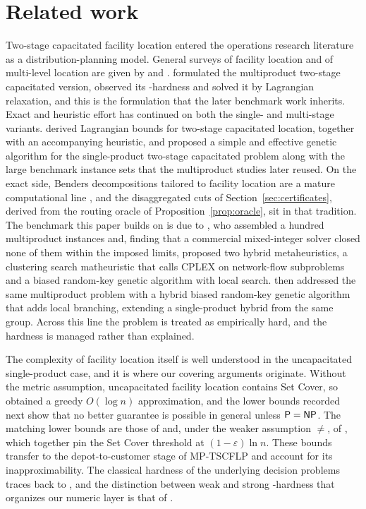 \section{Related work}\label{sec:literature}

Two-stage capacitated facility location entered the operations research
literature as a distribution-planning model. General surveys of facility
location and of multi-level location are given by \citet{KloseDrexl2005}
and \citet{OrtizAstorquizaEtAl2018}.
\citet{PirkulJayaraman1998} formulated the multiproduct two-stage
capacitated version, observed its \NP-hardness and solved it by
Lagrangian relaxation, and this is the formulation that the later
benchmark work inherits. Exact and heuristic effort has continued on both
the single- and multi-stage variants. \citet{LitvinchevOzuna2012} derived
Lagrangian bounds for two-stage capacitated location, together with an
accompanying heuristic, and \citet{FernandesEtAl2014} proposed a simple
and effective genetic algorithm for the single-product two-stage capacitated problem
along with the large benchmark instance sets that the multiproduct
studies later reused. On the exact side, Benders decompositions tailored
to facility location are a mature computational line
\citep{FischettiLjubicSinnl2017}, and the disaggregated cuts of
Section~\ref{sec:certificates}, derived from the routing oracle of
Proposition~\ref{prop:oracle}, sit in that tradition. The benchmark this paper builds on is due
to \citet{MauriEtAl2021}, who assembled a hundred multiproduct instances
and, finding that a commercial mixed-integer solver closed none of them
within the imposed limits, proposed two hybrid metaheuristics, a
clustering search matheuristic that calls CPLEX on network-flow
subproblems and a biased random-key genetic algorithm with local search.
\citet{MoraisEtAl2022} then addressed the same multiproduct problem with
a hybrid biased random-key genetic algorithm that adds local branching,
extending a single-product hybrid from the same group. Across this line the problem is treated as empirically hard, and
the hardness is managed rather than explained.

The complexity of facility location itself is well understood in the
uncapacitated single-product case, and it is where our covering arguments
originate. Without the metric assumption, uncapacitated facility location
contains Set Cover, so \citet{Hochbaum1982} obtained a greedy
$O(\log n)$ approximation, and the lower bounds recorded next show that no
better guarantee is possible in general unless $\textsf{P}=\textsf{NP}$.
The matching lower bounds are those of \citet{Feige1998} and, under the
weaker assumption \Ppoly${}\neq{}$\NP, of \citet{DinurSteurer2014},
which together pin the Set Cover threshold at $(1-\varepsilon)\ln n$.
These bounds transfer to the depot-to-customer stage of MP-TSCFLP and
account for its inapproximability. The classical hardness of the
underlying decision problems traces back to \citet{Karp1972}, and the
distinction between weak and strong \NP-hardness that organizes our
numeric layer is that of \citet{GareyJohnson1979}.

